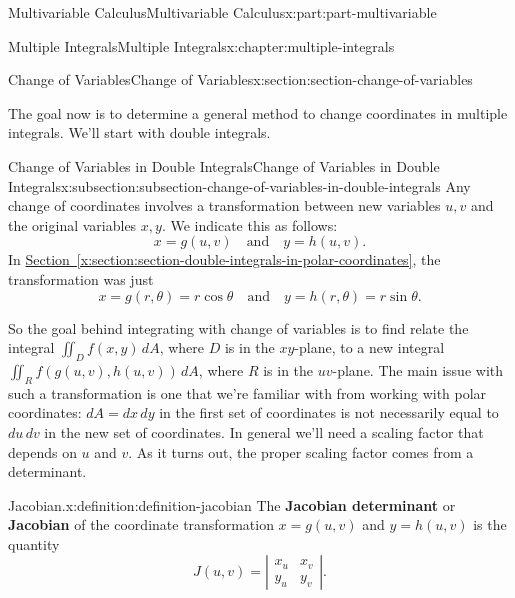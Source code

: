 \documentclass[twoside,10pt,]{tufte-book}
\newcommand{\xreffont}{\relax}
\newcommand{\terminology}[1]{\textbf{#1}}
\numberwithin{equation}{part}
\newcommand{\qq}[1]{\quad\text{#1}\quad}
\newcommand{\amp}{&}
\begin{document}
\begin{partptx}{Multivariable Calculus}{}{Multivariable Calculus}{}{}{x:part:part-multivariable}
\begin{chapterptx}{Multiple Integrals}{}{Multiple Integrals}{}{}{x:chapter:multiple-integrals}
\typeout{************************************************}
%
\begin{sectionptx}{Change of Variables}{}{Change of Variables}{}{}{x:section:section-change-of-variables}
\begin{introduction}{}%
The goal now is to determine a general method to change coordinates in multiple integrals. We'll start with double integrals.%
\end{introduction}%
%
%
\typeout{************************************************}
\typeout{************************************************}
%
\begin{subsectionptx}{Change of Variables in Double Integrals}{}{Change of Variables in Double Integrals}{}{}{x:subsection:subsection-change-of-variables-in-double-integrals}
Any change of coordinates involves a transformation between new variables \(u,v\) and the original variables \(x,y\). We indicate this as follows:%
\begin{equation*}
x = g(u,v) \qq{and} y = h(u,v)\text{.}
\end{equation*}
In \hyperref[x:section:section-double-integrals-in-polar-coordinates]{Section~{\xreffont\ref{x:section:section-double-integrals-in-polar-coordinates}}}, the transformation was just%
\begin{equation*}
x = g(r,\theta) = r\cos\theta \qq{and} y = h(r,\theta) = r\sin\theta\text{.}
\end{equation*}
%
\par
So the goal behind integrating with change of variables is to find relate the integral \(\iint_{D}f(x,y)\,dA\), where \(D\) is in the \(xy\)-plane, to a new integral \(\iint_{R}f(g(u,v),h(u,v))\,dA\), where \(R\) is in the \(uv\)-plane. The main issue with such a transformation is one that we're familiar with from working with polar coordinates: \(dA = dx\,dy\) in the first set of coordinates is not necessarily equal to \(du\,dv\) in the new set of coordinates. In general we'll need a scaling factor that depends on \(u\) and \(v\). As it turns out, the proper scaling factor comes from a determinant.%
\begin{definition}{Jacobian.}{x:definition:definition-jacobian}%
%
The \terminology{Jacobian determinant} or \terminology{Jacobian} of the coordinate transformation \(x = g(u,v)\) and \(y = h(u,v)\) is the quantity%
\begin{equation*}
J(u,v) = \left|\begin{array}{cc} x_{u} \amp x_{v} \\ y_{u} \amp y_{v}\end{array}\right|\text{.}

\end{equation*}
\end{definition}
\end{subsectionptx}
\end{sectionptx}
\end{chapterptx}
\end{partptx}
\end{document}
